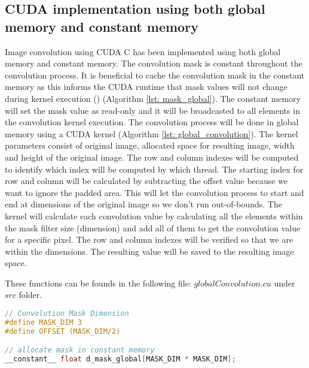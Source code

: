 \subsection{CUDA implementation using both global memory and constant memory}
Image convolution using CUDA C has been implemented using both global memory and constant memory. The convolution mask is constant throughout the convolution process. It is beneficial to cache the convolution mask in the constant memory as this informs the CUDA runtime that mask values will not change during kernel execution (\cite{parallel}) (Algorithm \ref{lst: mask_global}). The constant memory will set the mask value as read-only and it will be broadcasted to all elements in the convolution kernel execution. The convolution process will be done in global memory using a CUDA kernel (Algorithm \ref{lst: global_convolution}). The kernel parameters consist of original image, allocated space for resulting image, width and height of the original image. The row and column indexes will be computed to identify which index will be computed by which thread. The starting index for row and column will be calculated by subtracting the offset value because we want to ignore the padded area. This will let the convolution process to start and end at dimensions of the original image so we don't run out-of-bounds. The kernel will calculate each convolution value by calculating all the elements within the mask filter size (dimension) and add all of them to get the convolution value for a specific pixel. The row and column indexes will be verified so that we are within the dimensions. The resulting value will be saved to the resulting image space.

These functions can be founds in the following file: $globalConvolution.cu$ under $src$ folder.
\begin{lstlisting}[language=C, label={lst: mask_global}, caption= Cache mask in to the constant memory]
// Convolution Mask Dimension
#define MASK_DIM 3
#define OFFSET (MASK_DIM/2)

// allocate mask in constant memory
__constant__ float d_mask_global[MASK_DIM * MASK_DIM];
\end{lstlisting}



